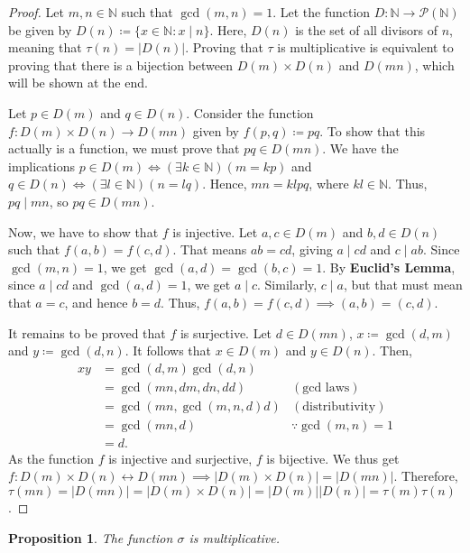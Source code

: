 \documentclass[a4paper]{article}
\newtheorem{proposition}[theorem]{Proposition}
\theoremstyle{definition}
\begin{document}
\begin{proof}
    Let $m,n \in \mathbb{N}$ such that $\gcd(m,n) = 1$.
    Let the function $D: \mathbb{N} \to \mathcal{P}(\mathbb{N})$ be given by $D(n) \coloneq \{x \in \mathbb{N} \mathrel{:} x \mid n\}$. Here, $D(n)$ is the set of all divisors of $n$, meaning that $\tau(n) = |D(n)|$.
    Proving that $\tau$ is multiplicative is equivalent to proving that there is a bijection between $D(m) \times D(n)$ and $D(mn)$, which will be shown at the end.

    Let $p \in D(m)$ and $q \in D(n)$.
    Consider the function $f: D(m) \times D(n) \to D(mn)$ given by $f(p,q) \coloneq pq$.
    To show that this actually is a function, we must prove that $pq \in D(mn)$.
    We have the implications $p \in D(m) \iff (\exists k \in \mathbb{N})(m = kp)$ and $q \in D(n) \iff (\exists l \in \mathbb{N})(n = lq)$.
    Hence, $mn = klpq$, where $kl \in \mathbb{N}$.
    Thus, $pq \mid mn$, so $pq \in D(mn)$.

    Now, we have to show that $f$ is injective.
    Let $a,c \in D(m)$ and $b,d \in D(n)$ such that $f(a,b) = f(c,d)$.
    That means $ab = cd$, giving $a \mid cd$ and $c \mid ab$.
    Since $\gcd(m,n) = 1$, we get $\gcd(a,d) = \gcd(b,c) = 1$.
    By \textbf{Euclid's Lemma}, since $a \mid cd$ and $\gcd(a,d)=1$, we get $a \mid c$.
    Similarly, $c \mid a$, but that must mean that $a=c$, and hence $b=d$.
    Thus, $f(a,b) = f(c,d) \implies (a,b) = (c,d)$.

    It remains to be proved that $f$ is surjective.
    Let $d \in D(mn)$, $x \coloneq \gcd(d,m)$ and $y \coloneq \gcd(d,n)$.
    It follows that $x \in D(m)$ and $y \in D(n)$.
    Then,
    \begin{align*}
        xy & = \gcd(d,m) \gcd(d,n)                              \\
           & = \gcd(mn, dm, dn, dd)   & (\text{gcd laws})       \\
           & = \gcd(mn, \gcd(m,n,d)d) & (\text{distributivity}) \\
           & = \gcd(mn, d)            & \because \gcd (m,n)=1   \\
           & = d.
    \end{align*}
    As the function $f$ is injective and surjective, $f$ is bijective.
    We thus get $f: D(m) \times D(n) \leftrightarrow D(mn) \implies |D(m) \times D(n)| = |D(mn)|$.
    Therefore, $\tau(mn) = |D(mn)| = |D(m) \times D(n)| = |D(m)||D(n)| = \tau(m)\tau(n)$.
\end{proof}
\begin{proposition}
    The function $\sigma$ is multiplicative.
\end{proposition}
\end{document}
